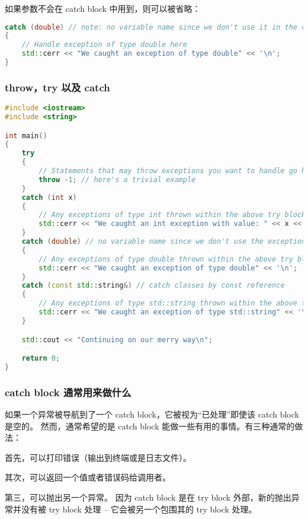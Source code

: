 \documentclass[../../LearnCpp.tex]{subfiles}
\begin{document}
如果参数不会在 catch block 中用到，则可以被省略：

\begin{lstlisting}[language=C++]
catch (double) // note: no variable name since we don't use it in the catch block below
{
    // Handle exception of type double here
    std::cerr << "We caught an exception of type double" << '\n';
}
\end{lstlisting}

\subsubsection*{throw，try 以及 catch}

\begin{lstlisting}[language=C++]
#include <iostream>
#include <string>

int main()
{
    try
    {
        // Statements that may throw exceptions you want to handle go here
        throw -1; // here's a trivial example
    }
    catch (int x)
    {
        // Any exceptions of type int thrown within the above try block get sent here
        std::cerr << "We caught an int exception with value: " << x << '\n';
    }
    catch (double) // no variable name since we don't use the exception itself in the catch block below
    {
        // Any exceptions of type double thrown within the above try block get sent here
        std::cerr << "We caught an exception of type double" << '\n';
    }
    catch (const std::string&) // catch classes by const reference
    {
        // Any exceptions of type std::string thrown within the above try block get sent here
        std::cerr << "We caught an exception of type std::string" << '\n';
    }

    std::cout << "Continuing on our merry way\n";

    return 0;
}
\end{lstlisting}

\subsubsection*{catch block 通常用来做什么}

如果一个异常被导航到了一个 catch block，它被视为“已处理”即使该 catch block 是空的。
然而，通常希望的是 catch block 能做一些有用的事情。有三种通常的做法：

首先，可以打印错误（输出到终端或是日志文件）。

其次，可以返回一个值或者错误码给调用者。

第三，可以抛出另一个异常。
因为 catch block 是在 try block 外部，新的抛出异常并没有被 try block 处理 --
它会被另一个包围其的 try block 处理。
\end{document}
